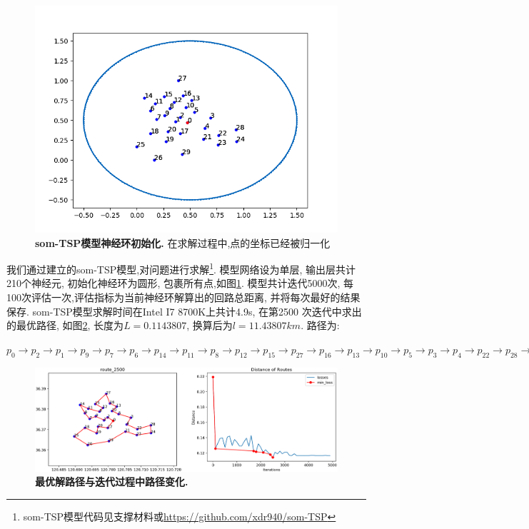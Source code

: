 \begin{figure}[h]
    \begin{center}
        \includegraphics[width=0.55\linewidth]{fig/init}
    \end{center}
    \caption{\textbf{som-TSP模型神经环初始化.} 在求解过程中,点的坐标已经被归一化 }
        \label{fig:init}
  \end{figure}
  我们通过建立的som-TSP模型,对问题进行求解\footnote{som-TSP模型代码见支撑材料或\url{https://github.com/xdr940/som-TSP}}. 模型网络设为单层, 输出层共计210个神经元, 初始化神经环为圆形, 包裹所有点,如图\ref{fig:init}. 
模型共计迭代5000次, 每100次评估一次,评估指标为当前神经环解算出的回路总距离, 并将每次最好的结果保存. som-TSP模型求解时间在Intel I7 8700K上共计4.9s, 在第2500 次迭代中求出的最优路径, 如图\ref{fig:solution}, 长度为$L=0.1143807$, 换算后为$l = 11.43807km$. 路径为:

$p_{0}\rightarrow p_2\rightarrow p_1\rightarrow p_9\rightarrow p_7\rightarrow p_6\rightarrow p_{14}\rightarrow p_{11}\rightarrow p_{8}\rightarrow  p_{12}\rightarrow  p_{15}\rightarrow  p_{27}\rightarrow  p_{16}\rightarrow  p_{13}\rightarrow  p_{10}\rightarrow p_{5}\rightarrow p_{3}\rightarrow p_{4}\rightarrow p_{22}\rightarrow  p_{28}\rightarrow p_{24}\rightarrow p_{23}\rightarrow p_{21}\rightarrow p_{29}\rightarrow p_{26}\rightarrow p_{25}\rightarrow p_{18}\rightarrow p_{19}\rightarrow p_{20}\rightarrow p_{17}$


\begin{figure}[h]
    \begin{center}
        \includegraphics[width=1.0\linewidth]{fig/solution}
    \end{center}
    \caption{\textbf{最优解路径与迭代过程中路径变化.} }
        \label{fig:solution}
  \end{figure}






